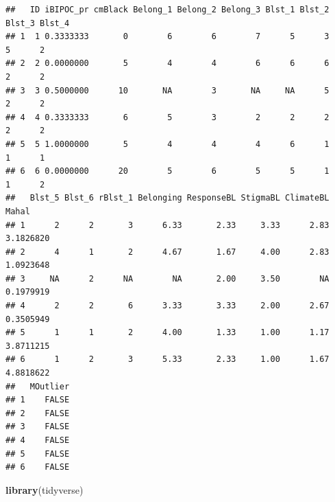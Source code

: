\documentclass[
  11pt,
]{book}
\newenvironment{Shaded}{\begin{snugshade}}{\end{snugshade}}
\newcommand{\CommentTok}[1]{\textcolor[rgb]{0.37,0.37,0.37}{\textit{#1}}}
\newcommand{\ConstantTok}[1]{\textcolor[rgb]{0.37,0.37,0.37}{#1}}
\newcommand{\DecValTok}[1]{\textcolor[rgb]{0.06,0.06,0.06}{#1}}
\newcommand{\FunctionTok}[1]{\textcolor[rgb]{0.27,0.27,0.27}{\textbf{#1}}}
\newcommand{\NormalTok}[1]{#1}
\newcommand{\OtherTok}[1]{\textcolor[rgb]{0.37,0.37,0.37}{#1}}
\newcommand{\SpecialCharTok}[1]{\textcolor[rgb]{0.43,0.43,0.43}{\textbf{#1}}}
\begin{document}
\begin{Shaded}
\end{Shaded}

\begin{verbatim}
##   ID iBIPOC_pr cmBlack Belong_1 Belong_2 Belong_3 Blst_1 Blst_2 Blst_3 Blst_4
## 1  1 0.3333333       0        6        6        7      5      3      5      2
## 2  2 0.0000000       5        4        4        6      6      6      2      2
## 3  3 0.5000000      10       NA        3       NA     NA      5      2      2
## 4  4 0.3333333       6        5        3        2      2      2      2      2
## 5  5 1.0000000       5        4        4        4      6      1      1      1
## 6  6 0.0000000      20        5        6        5      5      1      1      2
##   Blst_5 Blst_6 rBlst_1 Belonging ResponseBL StigmaBL ClimateBL     Mahal
## 1      2      2       3      6.33       2.33     3.33      2.83 3.1826820
## 2      4      1       2      4.67       1.67     4.00      2.83 1.0923648
## 3     NA      2      NA        NA       2.00     3.50        NA 0.1979919
## 4      2      2       6      3.33       3.33     2.00      2.67 0.3505949
## 5      1      1       2      4.00       1.33     1.00      1.17 3.8711215
## 6      1      2       3      5.33       2.33     1.00      1.67 4.8818622
##   MOutlier
## 1    FALSE
## 2    FALSE
## 3    FALSE
## 4    FALSE
## 5    FALSE
## 6    FALSE
\end{verbatim}

\begin{Shaded}
\begin{Highlighting}[]
\FunctionTok{library}\NormalTok{(tidyverse)}
\end{Highlighting}
\end{Shaded}
\end{document}
